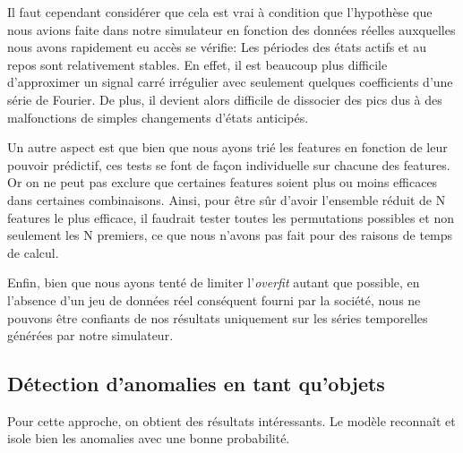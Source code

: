 \documentclass[french]{article}
\theoremstyle{mytheoremstyle}
\theoremstyle{mytheoremstyle}
\theoremstyle{myproblemstyle}
\begin{document}
        Il faut cependant considérer que cela est vrai à condition que l'hypothèse que nous avions faite dans notre simulateur en fonction des données réelles auxquelles nous avons rapidement eu accès se vérifie: Les périodes des états actifs et au repos sont relativement stables. En effet, il est beaucoup plus difficile d'approximer un signal carré irrégulier avec seulement quelques coefficients d'une série de Fourier. De plus, il devient alors difficile de dissocier des pics dus à des malfonctions de simples changements d'états anticipés.
        
    Un autre aspect est que bien que nous ayons trié les features en fonction de leur pouvoir prédictif, ces tests se font de façon individuelle sur chacune des features. Or on ne peut pas exclure que certaines features soient plus ou moins efficaces dans certaines combinaisons. Ainsi, pour être sûr d'avoir l'ensemble réduit de N features le plus efficace, il faudrait tester toutes les permutations possibles et non seulement les N premiers, ce que nous n'avons pas fait pour des raisons de temps de calcul.
    
    Enfin, bien que nous ayons tenté de limiter l'\emph{overfit} autant que possible, en l'absence d'un jeu de données réel conséquent fourni par la société, nous ne pouvons être confiants de nos résultats uniquement sur les séries temporelles générées par notre simulateur.
        
        
    \subsection{Détection d'anomalies en tant qu'objets}
    Pour cette approche, on obtient des résultats intéressants. Le modèle reconnaît et isole bien les anomalies avec une bonne probabilité.
    
\end{document}
